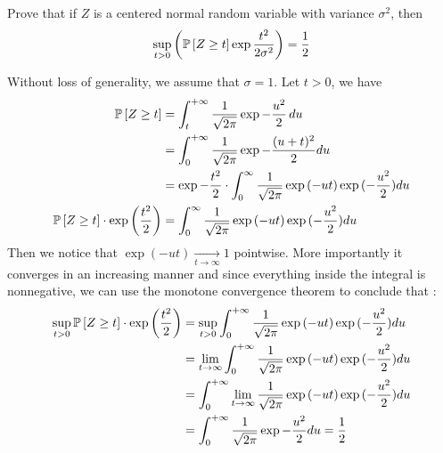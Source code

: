 \begin{exercise}[]{}
	Prove that if $ Z $ is a centered normal random variable with variance $ \sigma^2 $, then
\begin{equation*}
	\sup_{t>0}\left( \mathbb{P}\left[Z \geq t\right]\exp{\frac{t^2}{2\sigma^2}} \right) = \frac{1}{2}
\end{equation*}
\end{exercise}

\begin{solution}[]
	Without loss of generality, we assume that $ \sigma = 1 $. Let $ t>0 $, we have
\begin{align*}
	\mathbb{P}\left[Z \geq t\right] &= \int_{t}^{+\infty} \frac{1}{\sqrt{2 \pi}}\exp{-\frac{u^2}{2}}\,du \\
		      &= \int_{0}^{+\infty} \frac{1}{\sqrt{2 \pi}}\exp{-\frac{(u+t)^2}{2}}du \\
		      &= \exp{-\frac{t^2}{2}}\cdot \int_{0}^{\infty} \frac{1}{\sqrt{2 \pi}} \exp{(-ut)}\exp{(-\frac{u^2}{2})}du \\
	\mathbb{P}\left[Z \geq t\right]\cdot \exp{\left( \frac{t^2}{2} \right)} &=  \int_{0}^{\infty} \frac{1}{\sqrt{2 \pi}} \exp{(-ut)}\exp{(-\frac{u^2}{2})}du \\
\end{align*}
Then we notice that $ \exp(-ut) \underset{t\rightarrow\infty}{\rightarrow} 1 $ pointwise. More importantly it converges in an increasing manner and since everything inside the integral is nonnegative, we can use the monotone convergence theorem to conclude that :
\begin{align*}
	\sup_{t>0}\mathbb{P}\left[Z\geq t\right]\cdot \exp{\left( \frac{t^2}{2} \right)} &=\sup_{t>0} \int_{0}^{+\infty}\frac{1}{\sqrt{2 \pi}} \exp{(-ut)}\exp{(-\frac{u^2}{2})}  du\\
								       &= \lim_{t\rightarrow \infty}\int_{0}^{+\infty}\frac{1}{\sqrt{2 \pi}} \exp{(-ut)}\exp{(-\frac{u^2}{2})}du\\
								       &= \int_{0}^{+\infty} \lim_{t \rightarrow \infty} \frac{1}{\sqrt{2 \pi}} \exp{(-ut)} \exp{(-\frac{u^2}{2})}du\\
								       &= \int_{0}^{+\infty} \frac{1}{\sqrt{2 \pi}}\exp{-\frac{u^2}{2}}du = \frac{1}{2}
\end{align*}


\end{solution}
